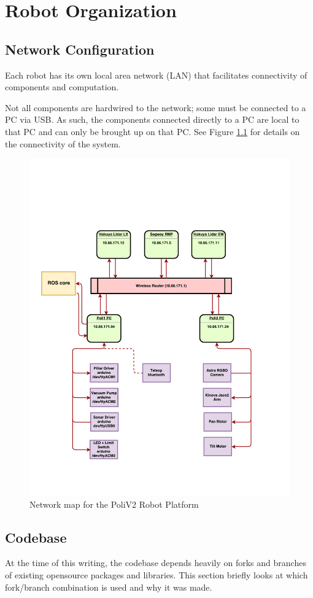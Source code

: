 \chapter{Robot Organization}\label{ch:robot_organization}

\section{Network Configuration}\label{sec:network_configuration}
Each robot has its own local area network (LAN) that facilitates connectivity of components and computation. 

Not all components are hardwired to the network; some must be connected to a PC via USB.
As such, the components connected directly to a PC are local to that PC and can only be brought up on that PC. See Figure \ref{fig:network_map} for details on the connectivity of the system.


\begin{figure}[h]
\centering
\includegraphics[width=425px]{figures/network_diagram_cropped.pdf}
\caption{Network map for the PoliV2 Robot Platform}
\label{fig:network_map}
\end{figure}

\section{Codebase}
At the time of this writing, the codebase depends heavily on forks and branches of existing opensource packages and libraries. 
This section briefly looks at which fork/branch combination is used and why it was made. \\

